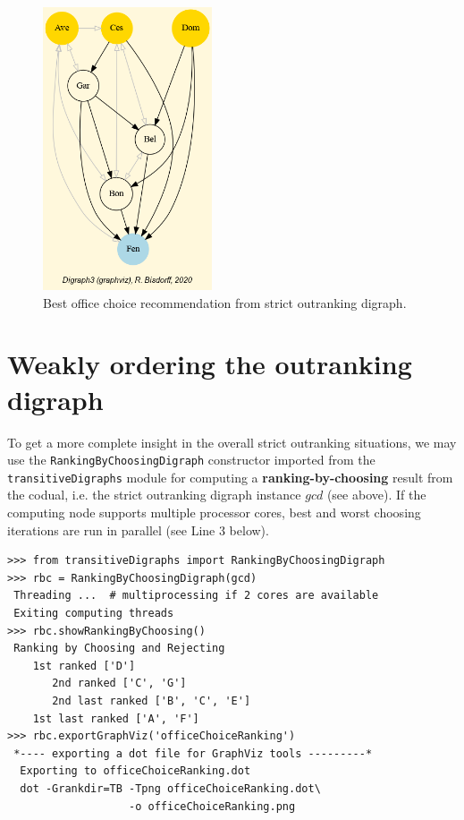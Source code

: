\begin{figure}[h]
\sidecaption
\includegraphics[width=5cm]{Figures/bestOfficeChoice.png}
\caption{Best office choice recommendation from strict outranking digraph.}
\label{fig:6.4}       %
\end{figure}

\section{Weakly ordering the outranking digraph}
\label{sec:6.6}

To get a more complete insight in the overall strict outranking situations, we may use the \texttt{RankingByChoosingDigraph} constructor imported from the \texttt{transitiveDigraphs} module for computing a \textbf{ranking-by-choosing} result from the codual, i.e. the strict outranking digraph instance $gcd$ (see above). If the computing node supports multiple processor cores, best and worst choosing iterations are run in parallel (see Line 3 below).

\begin{lstlisting}
>>> from transitiveDigraphs import RankingByChoosingDigraph
>>> rbc = RankingByChoosingDigraph(gcd)
 Threading ...  # multiprocessing if 2 cores are available
 Exiting computing threads
>>> rbc.showRankingByChoosing()
 Ranking by Choosing and Rejecting
    1st ranked ['D']
       2nd ranked ['C', 'G']
       2nd last ranked ['B', 'C', 'E']
    1st last ranked ['A', 'F']
>>> rbc.exportGraphViz('officeChoiceRanking')
 *---- exporting a dot file for GraphViz tools ---------*
  Exporting to officeChoiceRanking.dot
  dot -Grankdir=TB -Tpng officeChoiceRanking.dot\
                   -o officeChoiceRanking.png
\end{lstlisting}

